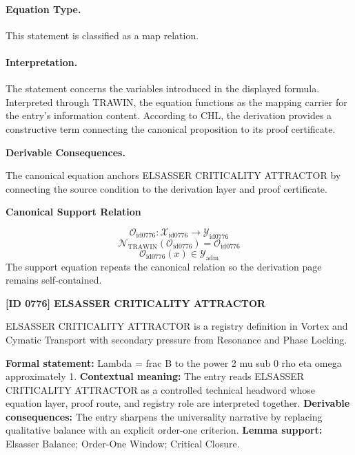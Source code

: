 \paragraph{Equation Type.}
This statement is classified as a map relation.

\paragraph{Interpretation.}
The statement concerns the variables introduced in the displayed formula. Interpreted through TRAWIN, the equation functions as the mapping carrier for the entry’s information content. According to CHL, the derivation provides a constructive term connecting the canonical proposition to its proof certificate.

\par\vspace{0.35em}
\noindent\textbf{Derivable Consequences.}\quad
\begingroup
\footnotesize
\raggedright
The canonical equation anchors ELSASSER CRITICALITY ATTRACTOR by connecting the source condition to the derivation layer and proof certificate.
\par\endgroup

\noindent\textbf{Canonical Support Relation}\par
\[
\mathcal{O}_{\mathrm{id0776}}:\mathcal{X}_{\mathrm{id0776}}\longrightarrow\mathcal{Y}_{\mathrm{id0776}}
\]
\[
\mathcal{N}_{\mathrm{TRAWIN}}(\mathcal{O}_{\mathrm{id0776}})=\mathcal{O}_{\mathrm{id0776}}
\]
\[
\mathcal{O}_{\mathrm{id0776}}(x)\in\mathcal{Y}_{\mathrm{adm}}
\]
\noindent The support equation repeats the canonical relation so the derivation page remains self-contained.\par

\clearpage
\noindent\textbf{[ID 0776] ELSASSER CRITICALITY ATTRACTOR}\par
\vspace{0.35em}
\begingroup\small
{}
ELSASSER CRITICALITY ATTRACTOR is a registry definition in Vortex and Cymatic Transport with secondary pressure from Resonance and Phase Locking.

\begingroup\footnotesize\setlength{\emergencystretch}{3em}\sloppy
\textbf{Formal statement:} Lambda = frac B to the power 2 mu sub 0 rho eta omega approximately 1. \textbf{Contextual meaning:} The entry reads ELSASSER CRITICALITY ATTRACTOR as a controlled technical headword whose equation layer, proof route, and registry role are interpreted together. \textbf{Derivable consequences:} The entry sharpens the universality narrative by replacing qualitative balance with an explicit order-one criterion. \textbf{Lemma support:} Elsasser Balance; Order-One Window; Critical Closure.\par
\endgroup

